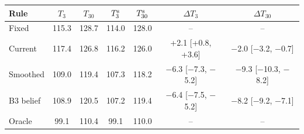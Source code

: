 \begin{tabular}{lcccccc}
\toprule
Rule & $T_3$ & $T_{30}$ & $T_3^{\rm s}$ & $T_{30}^{\rm s}$ & $\Delta T_3$ & $\Delta T_{30}$ \\
\midrule
Fixed & 115.3 & 128.7 & 114.0 & 128.0 & -- & -- \\
Current & 117.4 & 126.8 & 116.2 & 126.0 & +2.1 [+0.8, +3.6] & $-$2.0 [$-$3.2, $-$0.7] \\
Smoothed & 109.0 & 119.4 & 107.3 & 118.2 & $-$6.3 [$-$7.3, $-$5.2] & $-$9.3 [$-$10.3, $-$8.2] \\
B3 belief & 108.9 & 120.5 & 107.2 & 119.4 & $-$6.4 [$-$7.5, $-$5.2] & $-$8.2 [$-$9.2, $-$7.1] \\
Oracle & 99.1 & 110.4 & 99.1 & 110.0 & -- & -- \\
\bottomrule
\end{tabular}
